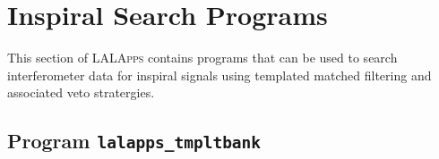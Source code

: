 
\clearpage

\section{Inspiral Search Programs}
\label{secion:inspiral}

This section of \textsc{LALApps} contains programs that can be used to search
interferometer data for inspiral signals using templated matched filtering and
associated veto stratergies.

\clearpage
\subsection{Program \texttt{lalapps\_tmpltbank}}
\label{program:lalapps-tmpltbank}

